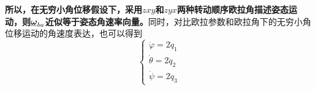 \textbf{所以，在无穷小角位移假设下，采用$zxy$和$zyx$两种转动顺序欧拉角描述姿态运动，则$\underline{\bm{\omega}}_{ba}$近似等于姿态角速率向量。}同时，对比欧拉参数和欧拉角下的无穷小角位移运动的角速度表达，也可以得到
\begin{equation}
	\begin{cases}
		\dot{\varphi} = 2 \dot{q}_1 \\
		\dot{\theta} = 2 \dot{q}_2 \\
		\dot{\psi} = 2 \dot{q}_3
	\end{cases}
\end{equation}









